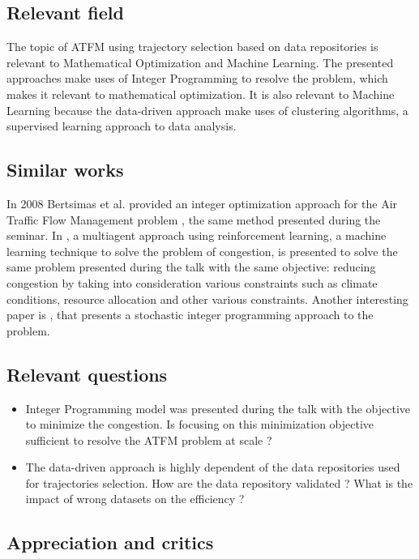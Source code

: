 \documentclass[11pt,a4paper]{article}
\begin{document}
\subsection{Relevant field}

The topic of ATFM using trajectory selection based on data repositories is relevant to Mathematical Optimization and Machine Learning. The presented approaches make uses of Integer Programming to resolve the problem, which makes it relevant to mathematical optimization. It is also relevant to Machine Learning because the data-driven approach make uses of clustering algorithms, a supervised learning approach to data analysis.

\subsection{Similar works}

In 2008 Bertsimas et al. provided an integer optimization approach for the Air Traffic Flow Management problem \cite{lodi_air_2008}, the same method presented during the seminar. In \cite{agogino_multiagent_2012}, a multiagent approach using reinforcement learning, a machine learning technique to solve the problem of congestion, is presented to solve the same problem presented during the talk with the same objective: reducing congestion by taking into consideration various constraints such as climate conditions, resource allocation and other various constraints. Another interesting paper is \cite{mukherjee_dynamic_2009}, that presents a stochastic integer programming approach to the problem.

\subsection{Relevant questions}

\begin{itemize}
  \item Integer Programming model was presented during the talk with the objective to minimize the congestion. Is focusing on this minimization objective sufficient to resolve the ATFM problem at scale ?
  \item The data-driven approach is highly dependent of the data repositories used for trajectories selection. How are the data repository validated ? What is the impact of wrong datasets on the efficiency ?
\end{itemize}

\subsection{Appreciation and critics}
\end{document}
